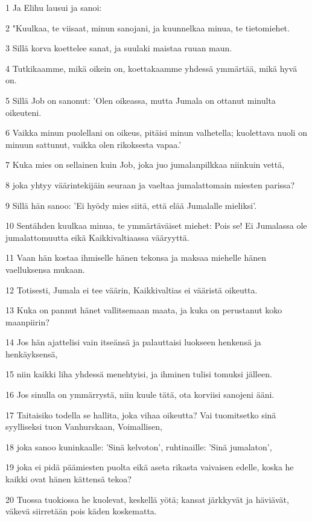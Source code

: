 \par 1 Ja Elihu lausui ja sanoi:
\par 2 "Kuulkaa, te viisaat, minun sanojani, ja kuunnelkaa minua, te tietomiehet.
\par 3 Sillä korva koettelee sanat, ja suulaki maistaa ruuan maun.
\par 4 Tutkikaamme, mikä oikein on, koettakaamme yhdessä ymmärtää, mikä hyvä on.
\par 5 Sillä Job on sanonut: 'Olen oikeassa, mutta Jumala on ottanut minulta oikeuteni.
\par 6 Vaikka minun puolellani on oikeus, pitäisi minun valhetella; kuolettava nuoli on minuun sattunut, vaikka olen rikoksesta vapaa.'
\par 7 Kuka mies on sellainen kuin Job, joka juo jumalanpilkkaa niinkuin vettä,
\par 8 joka yhtyy väärintekijäin seuraan ja vaeltaa jumalattomain miesten parissa?
\par 9 Sillä hän sanoo: 'Ei hyödy mies siitä, että elää Jumalalle mieliksi'.
\par 10 Sentähden kuulkaa minua, te ymmärtäväiset miehet: Pois se! Ei Jumalassa ole jumalattomuutta eikä Kaikkivaltiaassa vääryyttä.
\par 11 Vaan hän kostaa ihmiselle hänen tekonsa ja maksaa miehelle hänen vaelluksensa mukaan.
\par 12 Totisesti, Jumala ei tee väärin, Kaikkivaltias ei vääristä oikeutta.
\par 13 Kuka on pannut hänet vallitsemaan maata, ja kuka on perustanut koko maanpiirin?
\par 14 Jos hän ajattelisi vain itseänsä ja palauttaisi luokseen henkensä ja henkäyksensä,
\par 15 niin kaikki liha yhdessä menehtyisi, ja ihminen tulisi tomuksi jälleen.
\par 16 Jos sinulla on ymmärrystä, niin kuule tätä, ota korviisi sanojeni ääni.
\par 17 Taitaisiko todella se hallita, joka vihaa oikeutta? Vai tuomitsetko sinä syylliseksi tuon Vanhurskaan, Voimallisen,
\par 18 joka sanoo kuninkaalle: 'Sinä kelvoton', ruhtinaille: 'Sinä jumalaton',
\par 19 joka ei pidä päämiesten puolta eikä aseta rikasta vaivaisen edelle, koska he kaikki ovat hänen kättensä tekoa?
\par 20 Tuossa tuokiossa he kuolevat, keskellä yötä; kansat järkkyvät ja häviävät, väkevä siirretään pois käden koskematta.
